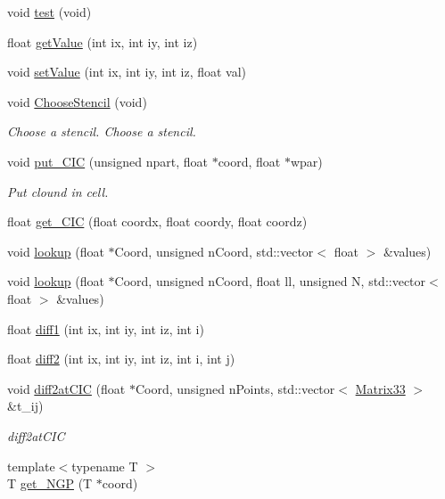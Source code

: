 \begin{DoxyCompactItemize}
\item 
void \hyperlink{classScalarField_a1edabc01b69868134bef0442e6cb7209}{test} (void)
\item 
float \hyperlink{classScalarField_ab8291579ca143400e68b82ca4f6dfe40}{getValue} (int ix, int iy, int iz)
\item 
void \hyperlink{classScalarField_a9627dfa6d889495e9878b908df64951d}{setValue} (int ix, int iy, int iz, float val)
\item 
void \hyperlink{classScalarField_a18e4f67a70252f244786b18eca1b3f6d}{ChooseStencil} (void)
\begin{DoxyCompactList}\small\item\em Choose a stencil. Choose a stencil. \item\end{DoxyCompactList}\item 
void \hyperlink{classScalarField_a75b8402bd2b6d403c9b624a2f122bca9}{put\_\-CIC} (unsigned npart, float $\ast$coord, float $\ast$wpar)
\begin{DoxyCompactList}\small\item\em Put clound in cell. \item\end{DoxyCompactList}\item 
float \hyperlink{classScalarField_a0180095878f086b9c267460867b3ffa7}{get\_\-CIC} (float coordx, float coordy, float coordz)
\item 
void \hyperlink{classScalarField_a3f0ba3f07c8d9b7173295dd7fafef84c}{lookup} (float $\ast$Coord, unsigned nCoord, std::vector$<$ float $>$ \&values)
\item 
void \hyperlink{classScalarField_a11cbe92b79dc3488bb6d300c033830b2}{lookup} (float $\ast$Coord, unsigned nCoord, float ll, unsigned N, std::vector$<$ float $>$ \&values)
\item 
float \hyperlink{classScalarField_acfad6a7264af1af97387a84e325b13b1}{diff1} (int ix, int iy, int iz, int i)
\item 
float \hyperlink{classScalarField_a2fcdbd62e44204d7ce1b056e8aa8fa55}{diff2} (int ix, int iy, int iz, int i, int j)
\item 
void \hyperlink{classScalarField_a41ef09b33aace34a588bc8859fe498db}{diff2atCIC} (float $\ast$Coord, unsigned nPoints, std::vector$<$ \hyperlink{classMatrix33}{Matrix33} $>$ \&t\_\-ij)
\begin{DoxyCompactList}\small\item\em diff2atCIC \item\end{DoxyCompactList}\item 
{\footnotesize template$<$typename T $>$ }\\T \hyperlink{classScalarField_a1448da2d4923dea8da2b0c61f0fe21c7}{get\_\-NGP} (T $\ast$coord)
\end{DoxyCompactItemize}



